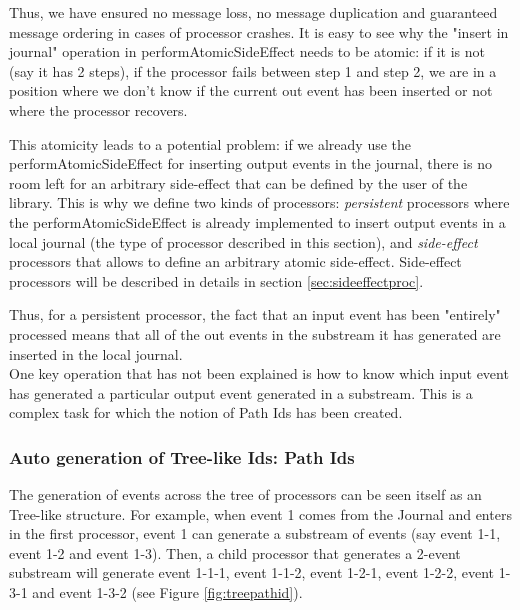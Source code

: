 Thus, we have ensured no message loss, no message duplication and guaranteed message ordering in cases of processor crashes. It is easy to see why the "insert in journal" operation in performAtomicSideEffect needs to be atomic: if it is not (say it has 2 steps), if the processor fails between step 1 and step 2, we are in a position where
we don't know if the current out event has been inserted or not where the processor recovers.

This atomicity leads to a potential problem: if we already use the performAtomicSideEffect for inserting output events in the journal, there is no room left for an arbitrary side-effect that can be defined by the user of the library. This is why we define two kinds of processors: \textit{persistent} processors where the performAtomicSideEffect is already implemented to insert output events in a local journal (the type of processor described in this section), and \textit{side-effect} processors that allows to define
an arbitrary atomic side-effect. Side-effect processors will be described in details in section \ref{sec:sideeffectproc}.

Thus, for a persistent processor, the fact that an input event has been "entirely" processed means that all of the out events in the substream it has generated are inserted in the local journal.
\\

One key operation that has not been explained is how to know which input event has generated a particular output event generated in a substream. This is a complex task for which the notion of Path Ids has been created.

\subsubsection{Auto generation of Tree-like Ids: Path Ids}

The generation of events across the tree of processors can be seen itself as an Tree-like structure. For example, when event 1 comes from the Journal and enters in the first
processor, event 1 can generate a substream of events (say event 1-1, event 1-2 and event 1-3). Then, a child processor that generates a 2-event substream
will generate event 1-1-1, event 1-1-2, event 1-2-1, event 1-2-2, event 1-3-1 and event 1-3-2 (see Figure \ref{fig:treepathid}).

